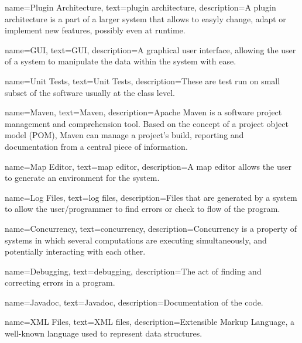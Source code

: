 {
    name={Plugin Architecture},
    text={plugin architecture},
    description={A plugin architecture is a part of a larger system that allows to easyly change, adapt or implement new features, possibly even at runtime.}
}

{
    name={GUI},
    text={GUI},
    description={A graphical user interface, allowing the user of a system to manipulate the data within the system with ease.}
}

{
    name={Unit Tests},
    text={Unit Tests},
    description={These are test run on small subset of the software usually at the class level.}
}

{
    name={Maven},
    text={Maven},
    description={Apache Maven is a software project management and comprehension tool. Based on the concept of a project object model (POM), Maven can manage a project's build, reporting and documentation from a central piece of information.}
}

{
    name={Map Editor},
    text={map editor},
    description={A map editor allows the user to generate an environment for the system.}
}

{
    name={Log Files},
    text={log files},
    description={Files that are generated by a system to allow the user/programmer to find errors or check to flow of the program.}
}

{
    name={Concurrency},
    text={concurrency},
    description={Concurrency is a property of systems in which several computations are executing simultaneously, and potentially interacting with each other.}
}

{
    name={Debugging},
    text={debugging},
    description={The act of finding and correcting errors in a program.}
}

{
    name={Javadoc},
    text={Javadoc},
    description={Documentation of the code.}
}

{
    name={XML Files},
    text={XML files},
    description={Extensible Markup Language, a well-known language used to represent data structures.}
}